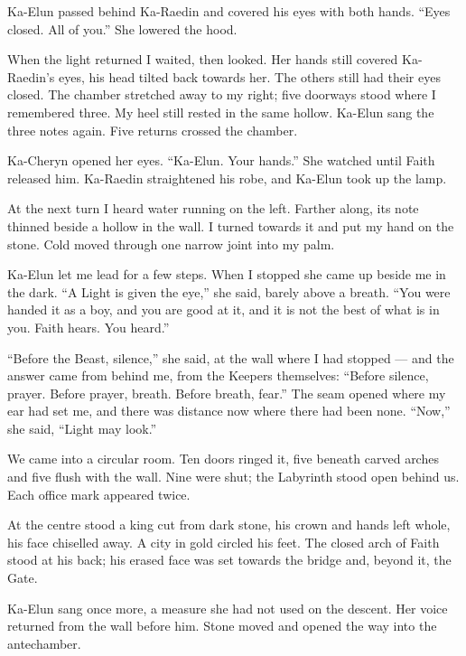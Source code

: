 Ka-Elun passed behind Ka-Raedin and covered his eyes with both hands. ``Eyes closed. All of you.'' She lowered the hood.\par

When the light returned I waited, then looked. Her hands still covered Ka-Raedin's eyes, his head tilted back towards her. The others still had their eyes closed. The chamber stretched away to my right; five doorways stood where I remembered three. My heel still rested in the same hollow. Ka-Elun sang the three notes again. Five returns crossed the chamber.\par

Ka-Cheryn opened her eyes. ``Ka-Elun. Your hands.'' She watched until Faith released him. Ka-Raedin straightened his robe, and Ka-Elun took up the lamp.\par

At the next turn I heard water running on the left. Farther along, its note thinned beside a hollow in the wall. I turned towards it and put my hand on the stone. Cold moved through one narrow joint into my palm.\par

Ka-Elun let me lead for a few steps. When I stopped she came up beside me in the dark. ``A Light is given the eye,'' she said, barely above a breath. ``You were handed it as a boy, and you are good at it, and it is not the best of what is in you. Faith hears. You heard.''\par

``Before the Beast, silence,'' she said, at the wall where I had stopped --- and the answer came from behind me, from the Keepers themselves: ``Before silence, prayer. Before prayer, breath. Before breath, fear.'' The seam opened where my ear had set me, and there was distance now where there had been none. ``Now,'' she said, ``Light may look.''\par

We came into a circular room. Ten doors ringed it, five beneath carved arches and five flush with the wall. Nine were shut; the Labyrinth stood open behind us. Each office mark appeared twice.\par

At the centre stood a king cut from dark stone, his crown and hands left whole, his face chiselled away. A city in gold circled his feet. The closed arch of Faith stood at his back; his erased face was set towards the bridge and, beyond it, the Gate.\par

Ka-Elun sang once more, a measure she had not used on the descent. Her voice returned from the wall before him. Stone moved and opened the way into the antechamber.\par

